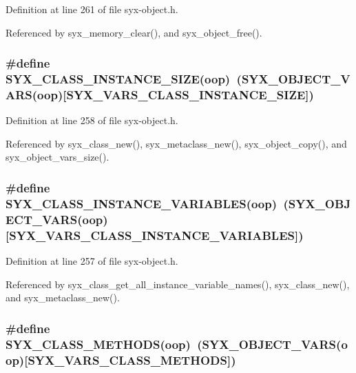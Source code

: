 Definition at line 261 of file syx-object.h.

Referenced by syx\_\-memory\_\-clear(), and syx\_\-object\_\-free().\hypertarget{syx-object_8h_1fdb5e90c4eb0bca307b103320486ccb}{
\subsubsection{\setlength{\rightskip}{0pt plus 5cm}\#define SYX\_\-CLASS\_\-INSTANCE\_\-SIZE(oop)~(SYX\_\-OBJECT\_\-VARS(oop)\mbox{[}SYX\_\-VARS\_\-CLASS\_\-INSTANCE\_\-SIZE\mbox{]})}}
\label{syx-object_8h_1fdb5e90c4eb0bca307b103320486ccb}




Definition at line 258 of file syx-object.h.

Referenced by syx\_\-class\_\-new(), syx\_\-metaclass\_\-new(), syx\_\-object\_\-copy(), and syx\_\-object\_\-vars\_\-size().\hypertarget{syx-object_8h_57d3cc59dce77ddc68722cc919477a1e}{
\subsubsection{\setlength{\rightskip}{0pt plus 5cm}\#define SYX\_\-CLASS\_\-INSTANCE\_\-VARIABLES(oop)~(SYX\_\-OBJECT\_\-VARS(oop)\mbox{[}SYX\_\-VARS\_\-CLASS\_\-INSTANCE\_\-VARIABLES\mbox{]})}}
\label{syx-object_8h_57d3cc59dce77ddc68722cc919477a1e}




Definition at line 257 of file syx-object.h.

Referenced by syx\_\-class\_\-get\_\-all\_\-instance\_\-variable\_\-names(), syx\_\-class\_\-new(), and syx\_\-metaclass\_\-new().\hypertarget{syx-object_8h_aa27d87840f036f2211dbe589cdb712d}{
\subsubsection{\setlength{\rightskip}{0pt plus 5cm}\#define SYX\_\-CLASS\_\-METHODS(oop)~(SYX\_\-OBJECT\_\-VARS(oop)\mbox{[}SYX\_\-VARS\_\-CLASS\_\-METHODS\mbox{]})}}
\label{syx-object_8h_aa27d87840f036f2211dbe589cdb712d}




